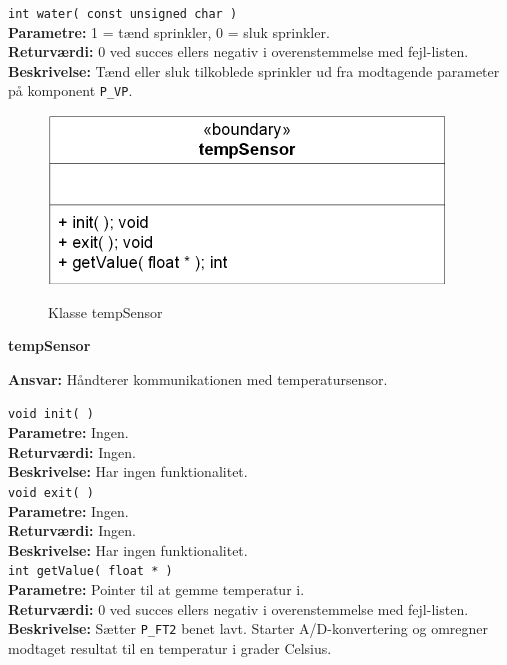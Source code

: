 \verb+int water( const unsigned char )+ \\
\textbf{Parametre:} 1 = tænd sprinkler, 0 = sluk sprinkler. \\
\textbf{Returværdi:} 0 ved succes ellers negativ i overenstemmelse med fejl-listen. \\
\textbf{Beskrivelse:} Tænd eller sluk tilkoblede sprinkler ud fra modtagende parameter på komponent \verb+P_VP+. \\


\begin{figure}[htbp] \centering
{\includegraphics[scale=1.3]{filer/design/Klassediagrammer/sw_psoc_tempSensor}}
\caption{Klasse tempSensor}
\label{fig:sw_psoc_class_tempSensor}
\end{figure} 

{\centering
\textbf{tempSensor}\par
}
\textbf{Ansvar:} Håndterer kommunikationen med temperatursensor. \

\verb+void init( )+ \\
\textbf{Parametre:} Ingen. \\
\textbf{Returværdi:} Ingen. \\
\textbf{Beskrivelse:} Har ingen funktionalitet. \\

\verb+void exit( )+ \\
\textbf{Parametre:} Ingen. \\
\textbf{Returværdi:} Ingen. \\
\textbf{Beskrivelse:} Har ingen funktionalitet. \\

\verb+int getValue( float * )+ \\
\textbf{Parametre:} Pointer til at gemme temperatur i. \\
\textbf{Returværdi:} 0 ved succes ellers negativ i overenstemmelse med fejl-listen. \\
\textbf{Beskrivelse:} Sætter \verb+P_FT2+ benet lavt. Starter A/D-konvertering og omregner modtaget resultat til en temperatur i grader Celsius. \\


